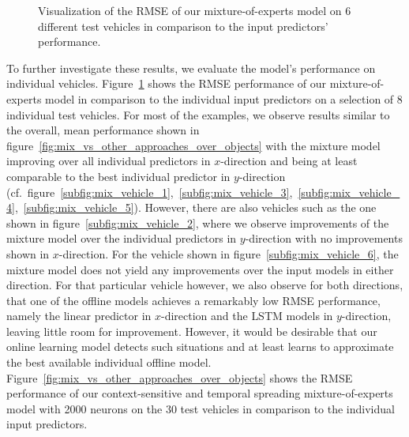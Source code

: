\begin{figure}[t]
    \caption{Visualization of the \ac{RMSE} of our mixture-of-experts model on \num{6} different test vehicles in comparison to the input predictors' performance.}
    \label{fig:mix_vehicle_examples}
\end{figure}

To further investigate these results, we evaluate the  model's performance on individual vehicles.
Figure~\ref{fig:mix_vehicle_examples} shows the \ac{RMSE} performance of our mixture-of-experts model in comparison to the individual input predictors on a selection of \num{8} individual test vehicles.
For most of the examples, we observe results similar to the overall, mean performance shown in figure~\ref{fig:mix_vs_other_approaches_over_objects} with the mixture model improving over all individual predictors in $x$-direction and being at least comparable to the best individual predictor in $y$-direction (cf.\ figure~\ref{subfig:mix_vehicle_1},~\ref{subfig:mix_vehicle_3},~\ref{subfig:mix_vehicle_4},~\ref{subfig:mix_vehicle_5}).
However, there are also vehicles such as the one shown in figure~\ref{subfig:mix_vehicle_2}, where we observe improvements of the mixture model over the individual predictors in $y$-direction with no improvements shown in $x$-direction.
For the vehicle shown in figure~\ref{subfig:mix_vehicle_6}, the mixture model does not yield any improvements over the input models in either direction.
For that particular vehicle however, we also observe for both directions, that one of the offline models achieves a remarkably low \ac{RMSE} performance, namely the linear predictor in $x$-direction and the \ac{LSTM} models in $y$-direction, leaving little room for improvement.
However, it would be desirable that our online learning model detects such situations and at least learns to approximate the best available individual offline model.
Figure~\ref{fig:mix_vs_other_approaches_over_objects} shows the \ac{RMSE} performance of our context-sensitive and temporal spreading mixture-of-experts model with \num{2000} neurons on the \num{30} test vehicles in comparison to the individual input predictors.

